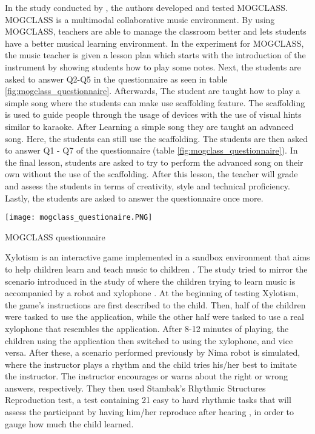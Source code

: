 \newpage

In the study conducted by , the authors developed and tested MOGCLASS. MOGCLASS is a multimodal collaborative music environment. By using MOGCLASS, teachers are able to manage the classroom better and lets students have a better musical learning environment. In the experiment for MOGCLASS, the music teacher is given a lesson plan which starts with the introduction of the instrument by showing students how to play some notes. Next, the students are asked to answer Q2-Q5 in the questionnaire as seen in table \ref{fig:mogclass_questionnaire}. Afterwards, The student are taught how to play a simple song where the students can make use scaffolding feature. The scaffolding is used to guide people through the usage of devices with the use of visual hints similar to karaoke. After Learning a simple song they are taught an advanced song. Here, the students can still use the scaffolding. The students are then asked to answer Q1 - Q7 of the questionnaire (table \ref{fig:mogclass_questionnaire}). In the final lesson, students are asked to try to perform the advanced song on their own without the use of the scaffolding. After this lesson, the teacher will grade and assess the students in terms of creativity, style and technical proficiency. Lastly, the students are asked to answer the questionnaire once more.

\begin{table}[H]
    \centering
    \texttt{[image: mogclass\_questionaire.PNG]}
    \caption{MOGCLASS questionnaire \protect\cite{zhou2011mogclass}}
    \label{fig:mogclass_questionnaire}
\end{table}

Xylotism is an interactive game implemented in a sandbox environment that aims to help children learn and teach music to children \cite{elahi2017xylotism}. The study tried to mirror the scenario introduced in the study of  where the children trying to learn music is accompanied by a robot and xylophone \cite{taheri2016social}. At the beginning of testing Xylotism, the game's instructions are first described to the child. Then, half of the children were tasked to use the application, while the other half were tasked to use a real xylophone that resembles the application. After 8-12 minutes of playing, the children using the application then switched to using the xylophone, and vice versa. After these, a scenario performed previously by Nima robot \cite{taheri2016social} is simulated, where the instructor plays a rhythm and the child tries his/her best to imitate the instructor. The instructor encourages or warns about the right or wrong answers, respectively. They then used Stambak’s Rhythmic Structures Reproduction test, a test containing 21 easy to hard rhythmic tasks that will assess the participant by having him/her reproduce after hearing \cite{gardner1971children}, in order to gauge how much the child learned.

